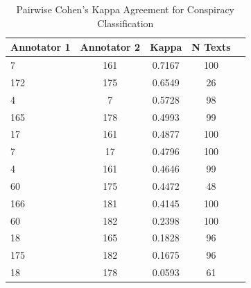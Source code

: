 \begin{table}[t]
\centering
\caption{Pairwise Cohen's Kappa Agreement for Conspiracy Classification}
\label{tab:pairwise_kappa}
\begin{tabular}{lcccc}
\toprule
Annotator 1 & Annotator 2 & Kappa & N Texts \\
\midrule
7 & 161 & 0.7167 & 100 \\
172 & 175 & 0.6549 & 26 \\
4 & 7 & 0.5728 & 98 \\
165 & 178 & 0.4993 & 99 \\
17 & 161 & 0.4877 & 100 \\
7 & 17 & 0.4796 & 100 \\
4 & 161 & 0.4646 & 99 \\
60 & 175 & 0.4472 & 48 \\
166 & 181 & 0.4145 & 100 \\
60 & 182 & 0.2398 & 100 \\
18 & 165 & 0.1828 & 96 \\
175 & 182 & 0.1675 & 96 \\
18 & 178 & 0.0593 & 61 \\
\bottomrule
\end{tabular}
\end{table}
